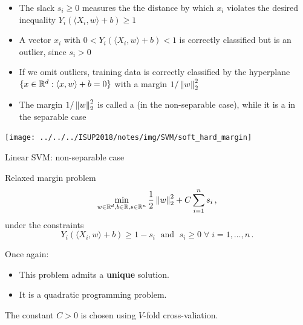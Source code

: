 \documentclass[xcolor={usenames,dvipsnames}]{beamer}
\begin{document}
\begin{frame}{}
  \begin{itemize}
    \item The slack $s_i \geq 0$ measures the the distance by which $x_i$ violates the desired inequality $Y_i (\langle {X_i, w} \rangle  + b) \geq 1$ 

\vspace{.2cm}

    \item A vector $x_i$ with $0 < Y_i (\langle {X_i, w} \rangle  + b) < 1$ is correctly classified but is an outlier, since $s_i > 0$

\vspace{.2cm}

    \item If we omit outliers, training data is correctly classified by the hyperplane $\{ x \in \mathbb{R}^d : \langle {x, w} \rangle  + b = 0 \}$ with a margin $1 / \left\| w \right\|_2^2$

\vspace{.2cm}
    
    \item The margin $1 / \left\| w \right\|_2^2$ is called a \textbf{} (in the non-separable case), while it is a \textbf{} in the separable case
  \end{itemize}

  \begin{center}
    \texttt{[image: ../../../ISUP2018/notes/img/SVM/soft\_hard\_margin]}  
  \end{center}
 \end{frame}   




\begin{frame}{Linear SVM: non-separable case}

\begin{block}{Relaxed margin problem}
$$
\min_{w \in \mathbb{R}^d, b \in \mathbb{R}, s \in \mathbb{R}^n} \frac 12 \left\| w \right\|_2^2 
  + C \sum_{i=1}^n s_i\,,
$$
under the constraints
$$
Y_i (\langle {X_i, w} \rangle  + b) \geq 1 - s_i \; 
  \text{ and } \; s_i \geq 0 \; \forall  \;i=1, \ldots, n\,.
$$
\end{block}

Once again:
\begin{itemize}
  \item This problem admits a \textbf{unique} solution.
  \item It is a quadratic programming problem.
\end{itemize}

\medskip
The constant $C > 0$ is chosen using $V$-fold cross-valiation.
\end{frame}
\end{document}

